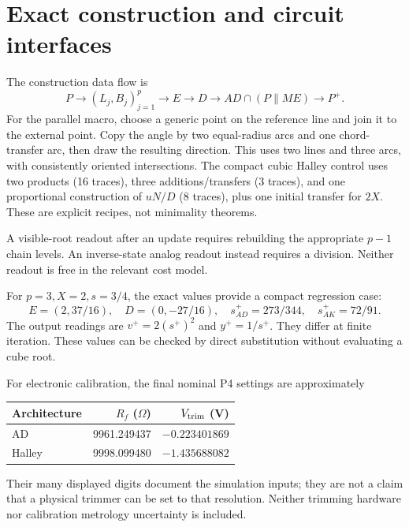 \documentclass[11pt,a4paper]{article}
\theoremstyle{remark}\newtheorem{remark}[theorem]{Remark}
\numberwithin{equation}{section}
\begin{document}
\section{Exact construction and circuit interfaces}
The construction data flow is
\[
 P\longrightarrow (L_j,B_j)_{j=1}^p\longrightarrow E
 \longrightarrow D\longrightarrow AD\cap(P\parallel ME)
 \longrightarrow P^+.
\]
For the parallel macro, choose a generic point on the reference line and join it to the external point. Copy the angle by two equal-radius arcs and one chord-transfer arc, then draw the resulting direction. This uses two lines and three arcs, with consistently oriented intersections. The compact cubic Halley control uses two products (16 traces), three additions/transfers (3 traces), and one proportional construction of $uN/D$ (8 traces), plus one initial transfer for $2X$. These are explicit recipes, not minimality theorems.

A visible-root readout after an update requires rebuilding the appropriate $p-1$ chain levels. An inverse-state analog readout instead requires a division. Neither readout is free in the relevant cost model.

For $p=3,X=2,s=3/4$, the exact values provide a compact regression case:
\begin{equation}
 E=(2,37/16),\quad D=(0,-27/16),\quad
 s^+_{AD}=273/344,\quad s^+_{AK}=72/91.
\end{equation}
The output readings are $v^+=2(s^+)^2$ and $y^+=1/s^+$. They differ at finite iteration. These values can be checked by direct substitution without evaluating a cube root.

For electronic calibration, the final nominal P4 settings are approximately
\begin{center}\small
\begin{tabular}{@{}lrr@{}}\toprule
Architecture & $R_f$ ($\Omega$) & $V_{\rm trim}$ (V)\\\midrule
AD & 9961.249437 & $-0.223401869$\\
Halley & 9998.099480 & $-1.435688082$\\\bottomrule
\end{tabular}
\end{center}
Their many displayed digits document the simulation inputs; they are not a claim that a physical trimmer can be set to that resolution. Neither trimming hardware nor calibration metrology uncertainty is included.

\begingroup
\small
\setlength{\bibsep}{3pt}


\endgroup
\end{document}
